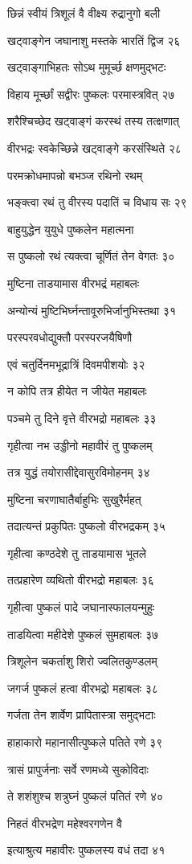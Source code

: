 छिन्नं स्वीयं त्रिशूलं वै वीक्ष्य रुद्रानुगो बली

खट्वाङ्गेन जघानाशु मस्तके भारतिं द्विज २६

खट्वाङ्गाभिहतः सोऽथ मुमूर्च्छ क्षणमुद्भटः

विहाय मूर्च्छां सद्वीरः पुष्कलः परमास्त्रवित् २७

शरैश्चिच्छेद खट्वाङ्गं करस्थं तस्य तत्क्षणात्

वीरभद्रः स्वकेच्छिन्ने खट्वाङ्गे करसंस्थिते २८

परमक्रोधमापन्नो बभञ्ज रथिनो रथम्

भङ्क्त्वा रथं तु वीरस्य पदातिं च विधाय सः २९

बाहुयुद्धेन युयुधे पुष्कलेन महात्मना

स पुष्कलो रथं त्यक्त्वा चूर्णितं तेन वेगतः ३०

मुष्टिना ताडयामास वीरभद्रं महाबलः

अन्योन्यं मुष्टिभिर्घ्नन्तावूरुभिर्जानुभिस्तथा ३१

परस्परवधोद्युक्तौ परस्परजयैषिणौ

एवं चतुर्दिनमभूद्रात्रिं दिवमपीशयोः ३२

न कोपि तत्र हीयेत न जीयेत महाबलः

पञ्चमे तु दिने वृत्ते वीरभद्रो महाबलः ३३

गृहीत्वा नभ उड्डीनो महावीरं तु पुष्कलम्

तत्र युद्धं तयोरासीद्देवासुरविमोहनम् ३४

मुष्टिना चरणाघातैर्बाहुभिः सुखुरैर्महत्

तदात्यन्तं प्रकुपितः पुष्कलो वीरभद्रकम् ३५

गृहीत्वा कण्ठदेशे तु ताडयामास भूतले

तत्प्रहारेण व्यथितो वीरभद्रो महाबलः ३६

गृहीत्वा पुष्कलं पादे जघानास्फालयन्मुहुः

ताडयित्वा महीदेशे पुष्कलं सुमहाबलः ३७

त्रिशूलेन चकर्ताशु शिरो ज्वलितकुण्डलम्

जगर्ज पुष्कलं हत्वा वीरभद्रो महाबलः ३८

गर्जता तेन शार्वेण प्रापितास्त्रा समुद्भटाः

हाहाकारो महानासीत्पुष्कले पतिते रणे ३९

त्रासं प्रापुर्जनाः सर्वे रणमध्ये सुकोविदाः

ते शशंशुश्च शत्रुघ्नं पुष्कलं पतितं रणे ४०

निहतं वीरभद्रेण महेश्वरगणेन वै

इत्याश्रुत्य महावीरः पुष्कलस्य वधं तदा ४१

